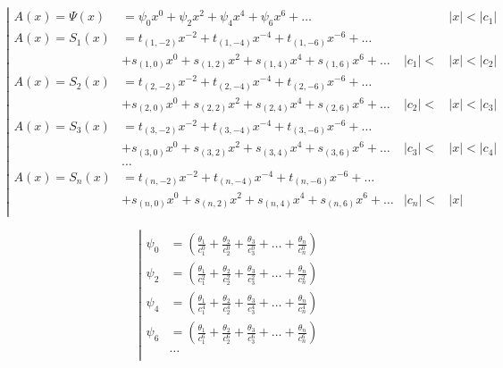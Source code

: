 \begin{equation*} \left| \begin{aligned}
A(x) = \Psi(x) &=
  \psi_0 x^0 
+ \psi_2 x^2
+ \psi_4 x^4 
+ \psi_6 x^6 
+ \ldots &
&|x| < |c_1| \\
%
A(x) = S_1(x) &= 
  t_{(1,-2)} x^{-2}
+ t_{(1,-4)} x^{-4}
+ t_{(1,-6)} x^{-6}
+ \ldots \\ &
+ s_{(1,0)} x^0
+ s_{(1,2)} x^2
+ s_{(1,4)} x^4
+ s_{(1,6)} x^6
+ \ldots &
|c_1| < &|x| < |c_2| \\
%
A(x) = S_2(x) &= 
  t_{(2,-2)} x^{-2}
+ t_{(2,-4)} x^{-4}
+ t_{(2,-6)} x^{-6}
+ \ldots \\ &
+ s_{(2,0)} x^0
+ s_{(2,2)} x^2
+ s_{(2,4)} x^4
+ s_{(2,6)} x^6
+ \ldots &
|c_2| < &|x| < |c_3| \\
%
A(x) = S_3(x) &= 
  t_{(3,-2)} x^{-2}
+ t_{(3,-4)} x^{-4}
+ t_{(3,-6)} x^{-6}
+ \ldots \\ &
+ s_{(3,0)} x^0
+ s_{(3,2)} x^2
+ s_{(3,4)} x^4
+ s_{(3,6)} x^6
+ \ldots &
|c_3| < &|x| < |c_4| \\
%
&\ldots \\
%
A(x) = S_n(x) &= 
  t_{(n,-2)} x^{-2}
+ t_{(n,-4)} x^{-4}
+ t_{(n,-6)} x^{-6}
+ \ldots \\ &
+ s_{(n,0)} x^0
+ s_{(n,2)} x^2
+ s_{(n,4)} x^4
+ s_{(n,6)} x^6
+ \ldots &
|c_n| < &|x| \\
\end{aligned} \right. \end{equation*}

\begin{equation*} \left| \begin{aligned}
\psi_0 &= \left(
  \frac{\theta_1}{c_1^0}
+ \frac{\theta_2}{c_2^0}
+ \frac{\theta_3}{c_3^0}
+ \ldots
+ \frac{\theta_n}{c_n^0} \right) \\
%
\psi_2 &= \left(
  \frac{\theta_1}{c_1^2}
+ \frac{\theta_2}{c_2^2}
+ \frac{\theta_3}{c_3^2}
+ \ldots
+ \frac{\theta_n}{c_n^2} \right) \\
%
\psi_4 &= \left(
  \frac{\theta_1}{c_1^4}
+ \frac{\theta_2}{c_2^4}
+ \frac{\theta_3}{c_3^4}
+ \ldots
+ \frac{\theta_n}{c_n^4} \right) \\
%
\psi_6 &= \left(
  \frac{\theta_1}{c_1^6}
+ \frac{\theta_2}{c_2^6}
+ \frac{\theta_3}{c_3^6}
+ \ldots
+ \frac{\theta_n}{c_n^6} \right) \\
%
&\ldots \\
\end{aligned} \right. \end{equation*}

